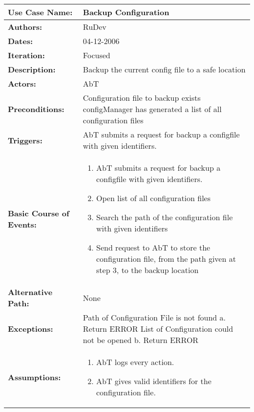 \begin{tabularx}{\linewidth}{|l|X|}
\hline
\textbf{Use Case Name:} & \textbf{Backup Configuration} \\
\hline
\textbf{Authors:} & RuDev \\
\hline
\textbf{Dates:} & 04-12-2006 \\
\hline
\textbf{Iteration:} & Focused \\
\hline
\textbf{Description:} & Backup the current config file to a safe location\\
\hline
\textbf{Actors:} & AbT \\
\hline
\textbf{Preconditions:} & Configuration file to backup exists \newline configManager has generated a list of all configuration files  \\
\hline
\textbf{Triggers:} & AbT submits a request for backup a configfile with given identifiers. \\
\hline
\textbf{Basic Course of Events:} & 
\begin{minipage}{\linewidth} 
  \vspace{0.05em}
  \begin{enumerate}
   \item AbT submits a request for backup a configfile with given identifiers.
   \item Open list of all configuration files
   \item Search the path of the configuration file with given identifiers
   \item Send request to AbT to store the configuration file, from the path given at step 3, to the backup location
  \end{enumerate}
  \vspace{0.05em}
\end{minipage}
\\
\hline 
\textbf{Alternative Path:} & None \\
\hline
\textbf{Exceptions:} & Path of Configuration File is not found \newline a. Return ERROR \newline \newline List of Configuration could not be opened \newline b. Return ERROR \\
\hline
\textbf{Assumptions:} & \begin{enumerate} 
							\item AbT logs every action.
							\item AbT gives valid identifiers for the configuration file.

\end{enumerate}
\end{tabularx}
